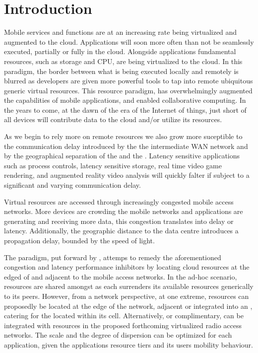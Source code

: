 \section{Introduction}
Mobile services and \ue{} functions are at an increasing rate being virtualized and augmented to the cloud. Applications will soon more often than not be seamlessly executed, partially or fully in the cloud. Alongside applications fundamental \ue{} resources, such as storage and CPU, are being virtualized to the cloud. In this paradigm, the border between what is being executed locally and remotely is blurred as developers are given more powerful tools to tap into remote ubiquitous generic virtual resources. This resource paradigm, has overwhelmingly augmented the capabilities of mobile applications, and enabled collaborative computing. In the years to come, at the dawn of the era of the Internet of things, just short of all devices will contribute data to the cloud and/or utilize its resources.

As we begin to rely more on remote resources we also grow more suceptible to the communication delay introduced by the the intermediate WAN network and by the geographical separation of the \ue{} and the \dc{}. Latency sensitive applications such as process controls, latency sensitive storage, real time video game rendering, and augmented reality video analysis will quickly falter if subject to a significant and varying communication delay.

Virtual resources are accessed through increasingly congested mobile access networks. More devices are crowding the mobile networks and applications are generating and receiving more data, this congestion translates into delay or latency. Additionally, the geographic distance to the data centre introduces a propagation delay, bounded by the speed of light.

The \xcloud{} paradigm, put forward by \cite{chandra2013decentralized,ericsson_akami}, attemps to remedy the aforementioned congestion and latency performance inhibitors by locating cloud resources at the edged of and adjacent to the mobile access networks. In the ad-hoc scenario, resources are shared amongst \ues{} as each \ue{} surrenders its available resources generically to its peers. However, from a network perspective, at one extreme, \dc{} resources can proposedly be located at the edge of the network, adjacent or integrated into an \rbs{}, catering for the \ues{} located within its cell. Alternatively, or complimentary, \dcs{} can be integrated with resources in the proposed forthcoming virtualized radio access networks. The scale and the degree of dispersion can be optimized for each application, given the applications resource tiers and its users mobility behaviour.

